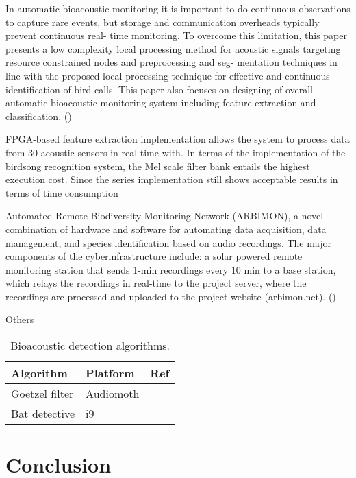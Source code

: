 In automatic bioacoustic monitoring it is important to do continuous observations to capture rare events, but storage and communication overheads typically prevent continuous real- time monitoring. To overcome this limitation, this paper presents a low complexity local processing method for acoustic signals targeting resource constrained nodes and preprocessing and seg- mentation techniques in line with the proposed local processing technique for effective and continuous identification of bird calls. This paper also focuses on designing of overall automatic bioacoustic monitoring system including feature extraction and classification.
(\cite{Weerasena2019})

FPGA-based feature extraction implementation allows the system to process data from 30 acoustic sensors in real time with.
In terms of the implementation of the birdsong recognition system, the Mel scale filter bank entails the highest execution cost. Since the series implementation still shows acceptable results in terms of time consumption %

Automated Remote Biodiversity Monitoring Network (ARBIMON), a novel combination of hardware and software for automating data acquisition, data management, and species identification based on audio recordings. The major components of the cyberinfrastructure include: a solar powered remote monitoring station that sends 1-min recordings every 10 min to a base station, which relays the recordings in real-time to the project server, where the recordings are processed and uploaded to the project website (arbimon.net). (\cite{Aide2013})

Others
\cite{Stowell2019}
\cite{Ovaskainen2018}


\begin{table}
\small
\centering
\caption{Bioacoustic detection algorithms.}
\label{biodetect}
\begin{tabular}{lll}
\toprule
Algorithm & Platform & Ref \\
\midrule
Goetzel filter & Audiomoth & \cite{Prince2019} \\
Bat detective & i9 & \cite{MacAodha2018} \\
\bottomrule
\end{tabular}
\end{table}

\section{Conclusion}

